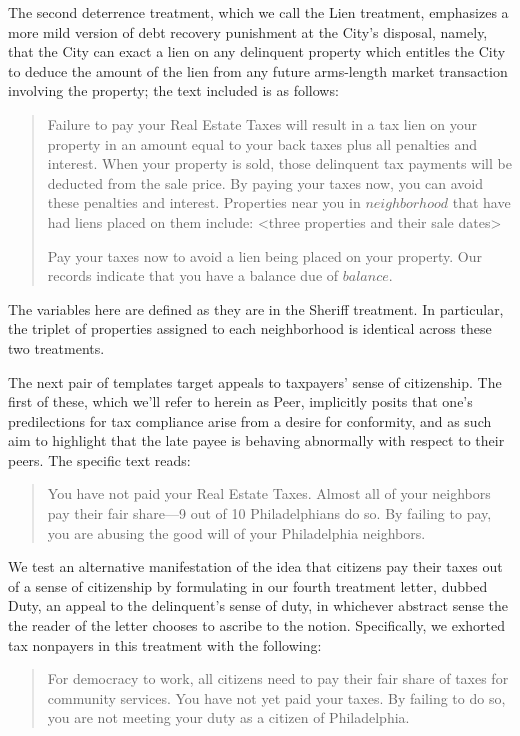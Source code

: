 \documentclass[12pt,titlepage]{article}
\begin{document}
The second deterrence treatment, which we call the Lien treatment, emphasizes 
a more mild version of debt recovery punishment at the City's disposal, 
namely, that the City can exact a lien on any delinquent property which 
entitles the City to deduce the amount of the lien from any future arms-length 
market transaction involving the property; the text included is as follows: 

\blockquote{
	Failure to pay your Real Estate Taxes will result in a tax lien on your 
	property in an amount equal to your back taxes plus all penalties and 
	interest. When your property is sold, those delinquent tax payments will 
	be deducted from the sale price. By paying your taxes now, you can avoid 
	these penalties and interest. Properties near you in $neighborhood$ that 
	have had liens placed on them include: 
	<three properties and their sale dates> 

	Pay your taxes now to avoid a lien being placed on your property. 
	Our records indicate that you have a balance due of $balance$.
}



The variables here are defined as they are in the Sheriff treatment. 
In particular, the triplet of properties assigned to each neighborhood is 
identical across these two treatments. 

The next pair of templates target appeals to taxpayers' sense of citizenship. 
The first of these, which we'll refer to herein as Peer, implicitly posits 
that one's predilections for tax compliance arise from a desire for conformity, 
and as such aim to highlight that the late payee is behaving abnormally with 
respect to their peers. The specific text reads:

\blockquote{
	
	You have not paid your Real Estate Taxes. Almost all of your neighbors 
	pay their fair share—9 out of 10 Philadelphians do so. By failing to pay, 
	you are abusing the good will of your Philadelphia neighbors.
}
 
We test an alternative manifestation of the idea that citizens pay their 
taxes out of a sense of citizenship by formulating in our fourth treatment 
letter, dubbed Duty, an appeal to the delinquent’s sense of duty, in whichever 
abstract sense the the reader of the letter chooses to ascribe to the notion. 
Specifically, we exhorted tax nonpayers in this treatment with the following:

\blockquote{
	For democracy to work, all citizens need to pay their fair share of taxes 
	for community services. You have not yet paid your taxes. By failing to 
	do so, you are not meeting your duty as a citizen of Philadelphia.
}
\end{document}
